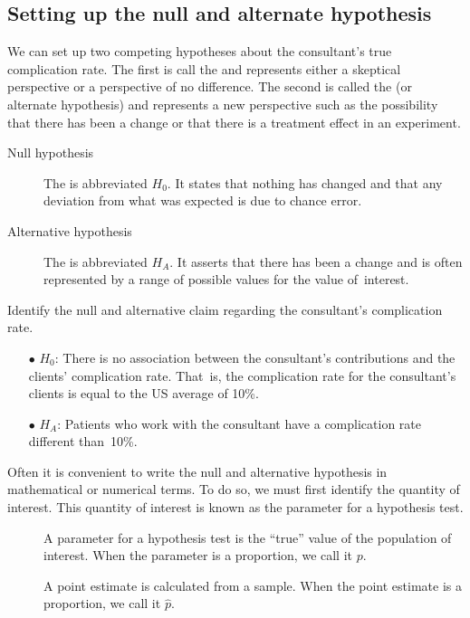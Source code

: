 \subsection{Setting up the null and alternate hypothesis}

We can set up two competing hypotheses about the consultant's true complication rate.  The first is call the  and represents either a skeptical perspective or a perspective of no difference. The second is called the  (or alternate hypothesis) and represents a new perspective such as the possibility that there has been a change or that there is a treatment effect in an experiment.

\begin{termBox}{
\begin{description}
\item[Null hypothesis] The  is abbreviated $H_0$.  It states that nothing has changed and that any deviation from what was expected is due to chance error.  
\item[Alternative hypothesis] The  is abbreviated $H_A$.  It asserts that there has been a change and is often represented by a range of possible values for the value of~interest.
\end{description}}
\end{termBox}

\begin{example}{Identify the null and alternative claim regarding the consultant's complication rate.}
\begin{itemize}
\item[$\bullet$] $H_0$: There is no association between the consultant's contributions and the clients' complication rate. That~is, the complication rate for the consultant's clients is equal to the US average of 10\%.
\item[$\bullet$] $H_A$: Patients who work with the consultant have a complication rate different than~10\%.
\end{itemize}
\end{example}

Often it is convenient to write the null and alternative hypothesis in mathematical or numerical terms.  To do so, we must first identify the quantity of interest.  This quantity of interest is known as the parameter for a hypothesis test.

\begin{termBox}{
\begin{description}
\item[] A parameter for a hypothesis test is the ``true'' value of the population of interest. When the parameter is a proportion, we call it $p$.
\item[] A point estimate is calculated from a sample.  When the point estimate is a proportion, we call it $\hat{p}$.  
\end{description}
}
\end{termBox}

